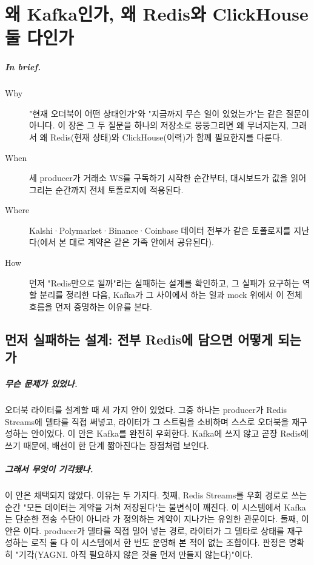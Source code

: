 \chapter{왜 Kafka인가, 왜 Redis와 ClickHouse 둘 다인가}
\label{ch:architecture}

\paragraph{In brief.}
\begin{description}
  \item[Why] "현재 오더북이 어떤 상태인가"와 "지금까지 무슨 일이 있었는가"는 같은
    질문이 아니다. 이 장은 그 두 질문을 하나의 저장소로 뭉뚱그리면 왜 무너지는지,
    그래서 왜 Redis(현재 상태)와 ClickHouse(이력)가 함께 필요한지를 다룬다.
  \item[When] 세 producer가 거래소 WS를 구독하기 시작한 순간부터, 대시보드가 값을
    읽어 그리는 순간까지 전체 토폴로지에 적용된다.
  \item[Where] Kalshi·Polymarket·Binance·Coinbase 데이터 전부가 같은 토폴로지를
    지난다(에서 본 대로 계약은 같은 가족 안에서 공유된다).
  \item[How] 먼저 "Redis만으로 될까"라는 실패하는 설계를 확인하고, 그 실패가 요구하는
    역할 분리를 정리한 다음, Kafka가 그 사이에서 하는 일과 mock 위에서 이 전체 흐름을
    먼저 증명하는 이유를 본다.
\end{description}

\section{먼저 실패하는 설계: 전부 Redis에 담으면 어떻게 되는가}
\label{sec:arch-redis-only}

\paragraph{무슨 문제가 있었나.} 오더북 라이터를 설계할 때 세 가지 안이 있었다. 그중
하나는 producer가 Redis Streams에 델타를 직접 써넣고, 라이터가 그 스트림을 소비하며
스스로 오더북을 재구성하는 안이었다. 이 안은 Kafka를 완전히 우회한다. Kafka에 쓰지
않고 곧장 Redis에 쓰기 때문에, 배선이 한 단계 짧아진다는 장점처럼 보인다.

\paragraph{그래서 무엇이 기각됐나.} 이 안은 채택되지 않았다. 이유는 두 가지다.
첫째, Redis Streams를 우회 경로로 쓰는 순간 "모든 데이터는 계약을 거쳐 저장된다"는
불변식이 깨진다. 이 시스템에서 Kafka는 단순한 전송 수단이 아니라 가
정의하는 계약이 지나가는 유일한 관문이다. 둘째, 이 안은 이다. producer가 델타를 직접 밀어 넣는 경로, 라이터가 그 델타로 상태를 재구성하는
로직 둘 다 이 시스템에서 한 번도 운영해 본 적이 없는 조합이다. 판정은 명확히
"기각(YAGNI. 아직 필요하지 않은 것을 먼저 만들지 않는다)"이다.

